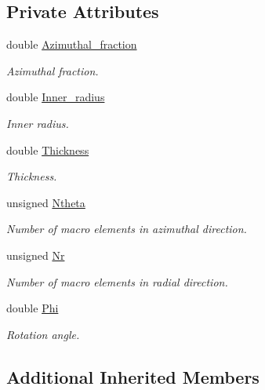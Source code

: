 \subsection*{Private Attributes}
\begin{DoxyCompactItemize}
\item 
double \hyperlink{classoomph_1_1AnnularDomain_ac6ea648ff2b80c412c6aec3a071945af}{Azimuthal\+\_\+fraction}
\begin{DoxyCompactList}\small\item\em Azimuthal fraction. \end{DoxyCompactList}\item 
double \hyperlink{classoomph_1_1AnnularDomain_a41bead396f1b49783caf334e56a6eb23}{Inner\+\_\+radius}
\begin{DoxyCompactList}\small\item\em Inner radius. \end{DoxyCompactList}\item 
double \hyperlink{classoomph_1_1AnnularDomain_a34008644354ffc3e7f48505557d95755}{Thickness}
\begin{DoxyCompactList}\small\item\em Thickness. \end{DoxyCompactList}\item 
unsigned \hyperlink{classoomph_1_1AnnularDomain_a42f197d2b806a961395f905d947b3e6e}{Ntheta}
\begin{DoxyCompactList}\small\item\em Number of macro elements in azimuthal direction. \end{DoxyCompactList}\item 
unsigned \hyperlink{classoomph_1_1AnnularDomain_a0cbd02650762aa5b6baf32936e553b64}{Nr}
\begin{DoxyCompactList}\small\item\em Number of macro elements in radial direction. \end{DoxyCompactList}\item 
double \hyperlink{classoomph_1_1AnnularDomain_a0280549bd7a88cabb84a7223ed114040}{Phi}
\begin{DoxyCompactList}\small\item\em Rotation angle. \end{DoxyCompactList}\end{DoxyCompactItemize}
\subsection*{Additional Inherited Members}


